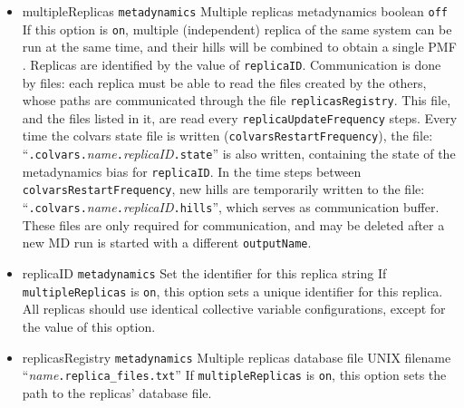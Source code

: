 \begin{itemize}

\item %
  \keydef
    {multipleReplicas}{%
    \texttt{metadynamics}}{%
    Multiple replicas metadynamics}{%
    boolean}{%
    \texttt{off}}{%
    If this option is \texttt{on}, multiple (independent) replica of the
    same system can be run at the same time, and their hills will be
    combined to obtain a single PMF \cite{Raiteri2005}.  Replicas are
    identified by the value of \texttt{replicaID}.  Communication is
    done by files: each replica must be able to read the files
    created by the others, whose paths are communicated through the file
    \texttt{replicasRegistry}.  This file, and the files listed in it,
    are read every \texttt{replicaUpdateFrequency} steps.  Every time
    the colvars state file is written
    (\texttt{colvarsRestartFrequency}), the file:\\
    ``\outputName\texttt{.colvars.}\emph{name}\texttt{.}\emph{replicaID}\texttt{.state}''
    is also written, containing
    the state of the metadynamics bias for \texttt{replicaID}.  In the
    time steps between \texttt{colvarsRestartFrequency}, new hills are
    temporarily written to the file:\\
    ``\outputName\texttt{.colvars.}\emph{name}\texttt{.}\emph{replicaID}\texttt{.hills}'',
    which serves as communication
    buffer.  These files are only required for communication, and may be
    deleted after a new MD run is started with a different
    \texttt{outputName}.  }
  
\item %
  \key
    {replicaID}{%
    \texttt{metadynamics}}{%
    Set the identifier for this replica}{%
    string}{%
    If \texttt{multipleReplicas} is \texttt{on}, this option sets a
    unique identifier for this replica.  All replicas should use
    identical collective variable configurations, except for the value
    of this option.}
  
\item %
  \keydef
    {replicasRegistry}{%
    \texttt{metadynamics}}{%
    Multiple replicas database file}{%
    UNIX filename}{%
    ``\emph{name}\texttt{.replica\_files.txt}''}{%
    If \texttt{multipleReplicas} is \texttt{on}, this option sets the
    path to the replicas' database file.
  }


\end{itemize}
